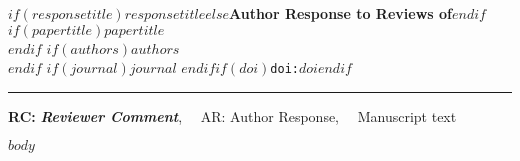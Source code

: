 \documentclass{article}
\begin{document}
{\Large\bf $if(responsetitle)$$responsetitle$$else$Author Response to Reviews of$endif$}\\[1em]
$if(papertitle)${\huge $papertitle$}\\[1em]$endif$
$if(authors)${$authors$}\\$endif$
$if(journal)${\it $journal$ }$endif$$if(doi)$\texttt{doi:$doi$}$endif$\\
\hrule

\hfill {\bfseries \color{gray}RC:} \textbf{\color{gray}\textit{Reviewer Comment}},\(\quad\) AR: Author Response,\(\quad\) \vrule width 3pt \hspace{5pt} {\selectfont Manuscript text}

$body$
\end{document}
